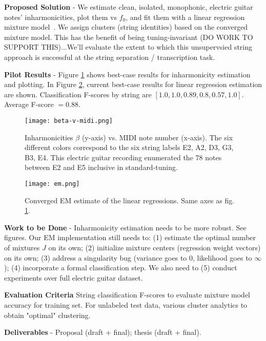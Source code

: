\documentclass[12pt]{cmuthesis}
\begin{document}
\noindent
\textbf{Proposed Solution} -  We estimate clean, isolated, monophonic, electric guitar notes' inharmonicities, plot them vs $f_0$, and fit them with a linear regression mixture model~\cite{faria2010}. We assign clusters (string identities) based on the converged mixture model. This has the benefit of being tuning-invariant (DO WORK TO SUPPORT THIS)...We'll evaluate the extent to which this unsupervsied string approach is successful at the string separation / transcription task.

\noindent
\textbf{Pilot Results} - Figure \ref{fig:beta} shows best-case results for inharmonicity estimation and plotting. In Figure \ref{fig:em}, current best-case results for linear regression estimation are shown. Classification F-scores by string are $[1.0, 1.0, 0.89, 0.8, 0.57, 1.0]$. Average F-score $ = 0.88$.

\begin{figure}[h]
\centering
\texttt{[image: beta-v-midi.png]}
\caption{Inharmonicities $\beta$ (y-axis) vs. MIDI note number (x-axis). The six different colors correspond to the six string labels E2, A2, D3, G3, B3, E4. This electric guitar recording enumerated the 78 notes between E2 and E5 inclusive in standard-tuning.}
\label{fig:beta}
\end{figure}

\begin{figure}[h]
\centering
\texttt{[image: em.png]}
\caption{Converged EM estimate of the linear regressions. Same axes as fig. \ref{fig:beta}.}
\label{fig:em}
\end{figure}

\noindent
\textbf{Work to be Done} - Inharmonicity estimation needs to be more robust. See figures. Our EM implementation still needs to: (1) estimate the optimal number of mixtures $J$ on its own; (2) initialize mixture centers (regression weight vectors) on its own; (3) address a singularity bug (variance goes to 0, likelihood goes to $\infty$); (4) incorporate a formal classification step. We also need to (5) conduct experiments over full electric guitar dataset.



\noindent
\textbf{Evaluation Criteria}
String classification F-scores to evaluate mixture model accuracy for training set. For unlabeled test data, various cluster analytics to obtain "optimal" clustering.

\noindent
\textbf{Deliverables} - Proposal (draft + final); thesis (draft + final).
\end{document}
